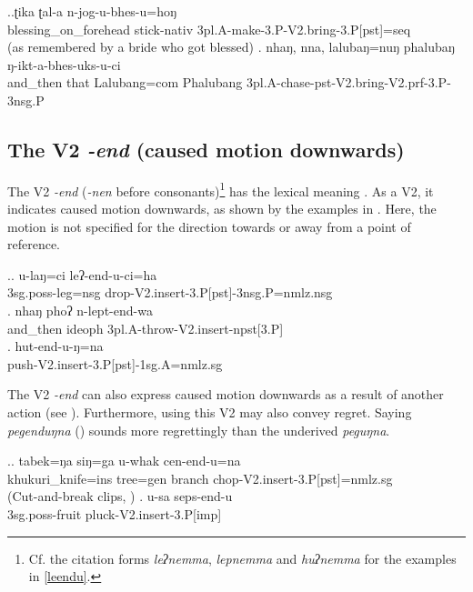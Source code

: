 \ex.\ag.ʈika ʈal-a n-jog-u-bhes-u=hoŋ\\
blessing\_on\_forehead stick{\sc -nativ} {\sc 3pl.A-}make{\sc -3.P-V2.bring-3.P[pst]=seq}\\
 (as remembered by a bride who got blessed) 
\bg. nhaŋ,    nna,  lalubaŋ=nuŋ phalubaŋ ŋ-ikt-a-bhes-uks-u-ci\\
and\_then that Lalubang{\sc =com}  Phalubang {\sc 3pl.A-}chase{\sc -pst-V2.bring-V2.prf-3.P-3nsg.P}\\
  


\subsection{The V2 \emph{-end}  (caused motion downwards)} \label{V2-insert}%

The V2 \emph{-end} (\ti \emph{-nen} before consonants)\footnote{Cf. the citation forms \emph{leʔnemma}, \emph{lepnemma} and \emph{huʔnemma} for the examples in \ref{leendu}.} has the lexical meaning . As a V2, it indicates caused motion downwards, as shown by the examples in \Next. Here, the motion is not specified for the direction towards or away from a point of reference.
 
\ex.\label{leendu}\ag. u-laŋ=ci leʔ-end-u-ci=ha\\
 {\sc 3sg.poss-}leg{\sc =nsg} drop{\sc -V2.insert-3.P[pst]-3nsg.P=nmlz.nsg}\\
\bg. nhaŋ    phoʔ   n-lept-end-wa\\
	and\_then {\sc ideoph}	{\sc 3pl.A-}throw{\sc -V2.insert-npst[3.P]}\\
	 
	\bg. hut-end-u-ŋ=na\\
	push{\sc -V2.insert-3.P[pst]-1sg.A=nmlz.sg}\\


The V2 \emph{-end} can also express caused motion downwards as a result of another action (see \Next). Furthermore, using this V2 may also convey regret. Saying \emph{pegenduŋna} () sounds more regrettingly than the underived  \emph{peguŋna}.

\ex.\ag. tabek=ŋa siŋ=ga u-whak cen-end-u=na\\
khukuri\_knife{\sc =ins} tree{\sc =gen} branch chop{\sc -V2.insert-3.P[pst]=nmlz.sg}\\
  (Cut-and-break clips, \citet{Bohnemeyeretal2010_cut})
\bg. u-sa seps-end-u\\
{\sc 3sg.poss-}fruit pluck{\sc -V2.insert-3.P[imp]}\\



